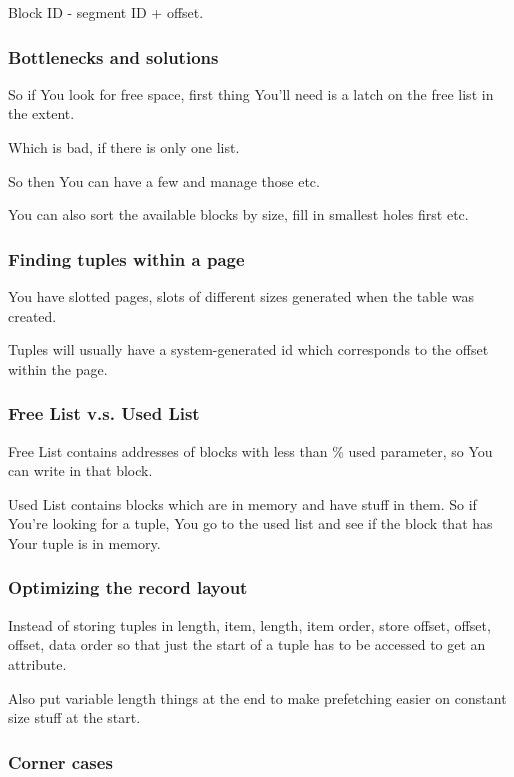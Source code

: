 \documentclass{article}
\begin{document}
				Block ID - segment ID + offset.
				
			\subsubsection{Bottlenecks and solutions}
			
				So if You look for free space, first thing You'll need is a latch on the free list in the extent.
				
				Which is bad, if there is only one list.
				
				So then You can have a few and manage those etc.
				
				You can also sort the available blocks by size, fill in smallest holes first etc.
				
			\subsubsection{Finding tuples within a page}
			
				You have slotted pages, slots of different sizes generated when the table was created.
				
				Tuples will usually have a system-generated id which corresponds to the offset within the page.
				
			\subsubsection{Free List v.s. Used List}
			
				Free List contains addresses of blocks with less than \% used parameter, so You can write in that block.
				
				Used List contains blocks which are in memory and have stuff in them. So if You're looking for a tuple, You go to the used list and see if the block that has Your tuple is in memory.
				
			\subsubsection{Optimizing the record layout}
			
				Instead of storing tuples in length, item, length, item order, store offset, offset, offset, data order so that just the start of a tuple has to be accessed to get an attribute.
				
				Also put variable length things at the end to make prefetching easier on constant size stuff at the start.
				
			\subsubsection{Corner cases}
			
\end{document}
